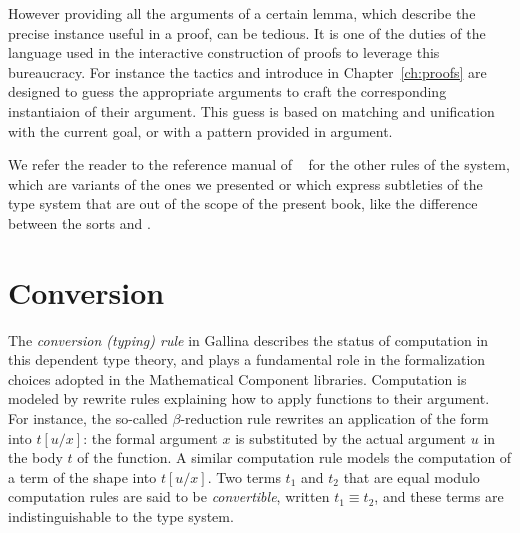 However providing all the arguments of a certain lemma, which describe
the precise instance useful in a proof, can be tedious. It is one of
the duties of the language used in the interactive construction of
proofs to leverage this bureaucracy. For instance the tactics
 and  introduce in Chapter~\ref{ch:proofs} are
designed to guess the appropriate arguments to craft the
corresponding instantiaion of their argument. This guess is based on
matching and unification with the current goal, or with a pattern
provided in argument.




We refer the reader
to the reference manual of \Coq{}~\cite{Coq:manual} for the other
rules of the system, which are variants of the ones we presented or
which express subtleties of the type system that are out of the scope of
the present book, like the difference between the sorts  and
.





\section{Conversion}\label{sec:conv}
The \emph{conversion (typing) rule} in Gallina describes the status of
computation in this dependent type theory, and plays a fundamental
role in the formalization choices adopted in the Mathematical
Component libraries. Computation is modeled by rewrite rules explaining how to
apply functions to their argument. For instance, the so-called
$\beta$-reduction rule rewrites an application of the form
 into $t[u/x]$: the formal argument
$x$ is substituted by the actual argument $u$ in the body $t$ of the
function. A similar computation rule models the computation of a term of
the shape  into $t[u/x]$. Two terms
$t_1$ and $t_2$ that are equal modulo computation rules are said to be
\emph{convertible}, written $t_1{}\equiv{}t_2$, and these terms
are indistinguishable to the type
system. 




